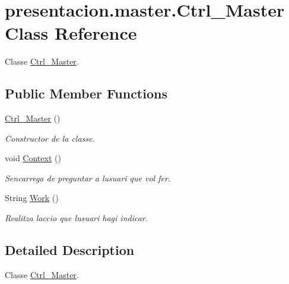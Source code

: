 \hypertarget{classpresentacion_1_1master_1_1Ctrl__Master}{}\section{presentacion.\+master.\+Ctrl\+\_\+\+Master Class Reference}
\label{classpresentacion_1_1master_1_1Ctrl__Master}


Classe \hyperlink{classpresentacion_1_1master_1_1Ctrl__Master}{Ctrl\+\_\+\+Master}.  


\subsection*{Public Member Functions}
\begin{DoxyCompactItemize}
\item 
\mbox{\label{classpresentacion_1_1master_1_1Ctrl__Master_a7336c36d767f4eb13e75761b67de17c4}} 
\hyperlink{classpresentacion_1_1master_1_1Ctrl__Master_a7336c36d767f4eb13e75761b67de17c4}{Ctrl\+\_\+\+Master} ()
\begin{DoxyCompactList}\small\item\em Constructor de la classe. \end{DoxyCompactList}\item 
\mbox{\label{classpresentacion_1_1master_1_1Ctrl__Master_adf19ba4025da7654d5e7c01d9f5650c1}} 
void \hyperlink{classpresentacion_1_1master_1_1Ctrl__Master_adf19ba4025da7654d5e7c01d9f5650c1}{Context} ()
\begin{DoxyCompactList}\small\item\em S\textquotesingle{}encarrega de preguntar a l\textquotesingle{}usuari que vol fer. \end{DoxyCompactList}\item 
String \hyperlink{classpresentacion_1_1master_1_1Ctrl__Master_aa25099e202de5e076b950e4e3bf5c26b}{Work} ()
\begin{DoxyCompactList}\small\item\em Realitza l\textquotesingle{}accio que l\textquotesingle{}usuari hagi indicar. \end{DoxyCompactList}\end{DoxyCompactItemize}


\subsection{Detailed Description}
Classe \hyperlink{classpresentacion_1_1master_1_1Ctrl__Master}{Ctrl\+\_\+\+Master}. 

